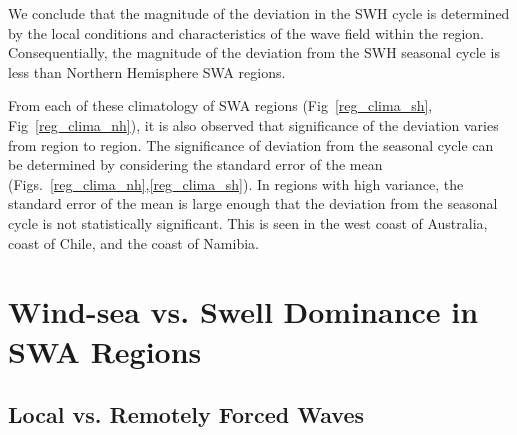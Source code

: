 \documentclass[12pt,twoside]{article}
\begin{document}
We conclude that the magnitude of the deviation in the SWH cycle is determined by the local conditions and characteristics of the wave field within the region. Consequentially, the magnitude of the deviation from the SWH seasonal cycle is less than Northern Hemisphere SWA regions.    

From each of these climatology of SWA regions (Fig~\ref{reg_clima_sh}, Fig~\ref{reg_clima_nh}), it is also observed that significance of the deviation varies from region to region. The significance of deviation from the seasonal cycle can be determined by considering the standard error of the mean (Figs.~\ref{reg_clima_nh},\ref{reg_clima_sh}). In regions with high variance, the standard error of the mean is large enough that the deviation from the seasonal cycle is not statistically significant. This is seen in the west coast of Australia, coast of Chile, and the coast of Namibia.  



\section{Wind-sea vs. Swell Dominance in SWA Regions}

\subsection{Local vs. Remotely Forced Waves}
\end{document}
